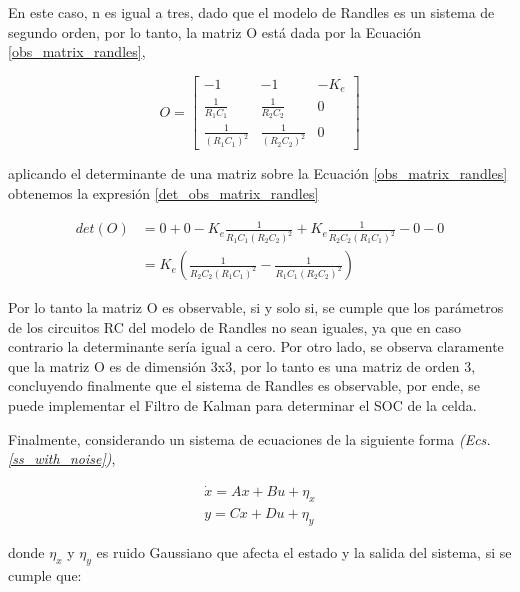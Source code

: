 \documentclass[10pt, a4paper]{report}
\begin{document}
En este caso, n es igual a tres, dado que el modelo de Randles es un sistema de 
segundo orden, por lo tanto, la matriz O est\'a dada por la Ecuaci\'on 
\ref{obs_matrix_randles},

\begin{equation}
    O = \begin{bmatrix}
        -1 & -1 & -K_e \\
        \frac{1}{R_1C_1} & \frac{1}{R_2C_2} & 0 \\
        \frac{1}{\left(R_1C_1\right)^2} & \frac{1}{\left(R_2C_2\right)^2} & 0
        \end{bmatrix}\label{obs_matrix_randles}
\end{equation}

aplicando el determinante de una matriz sobre la Ecuaci\'on
\ref{obs_matrix_randles} obtenemos la expresi\'on \ref{det_obs_matrix_randles}

\begin{align}
    det\left(O\right) &= 0 + 0 -K_e \frac{1}{R_1C_1\left(R_2C_2\right)^2} + 
                        K_e \frac{1}{R_2C_2\left(R_1C_1\right)^2} - 0 -
                        0\nonumber\\
                      &= K_e \left(\frac{1}{R_2C_2\left(R_1C_1\right)^2} - 
                                   \frac{1}{R_1C_1\left(R_2C_2\right)^2}\right)
                                   \label{det_obs_matrix_randles}
\end{align}

Por lo tanto la matriz O es observable, si y solo si, se cumple que los
par\'ametros de los circuitos RC del modelo de Randles no sean iguales, ya que
en caso contrario la determinante ser\'ia igual a cero. Por otro lado, se observa
claramente que la matriz O es de dimensi\'on 3x3, por lo tanto es una matriz de
orden 3, concluyendo finalmente que el sistema de Randles es observable, por 
ende, se puede implementar el Filtro de Kalman para determinar el \acrshort{SOC} 
de la celda.

Finalmente, considerando un sistema de ecuaciones de la siguiente forma \emph{(Ecs.
\ref{ss_with_noise})},

\begin{align}
    \dot{x} = Ax + Bu + \eta_x\nonumber\\
    y = Cx + Du + \eta_y\label{ss_with_noise}
\end{align}

donde $\eta_x$ y $\eta_y$ es ruido Gaussiano que afecta el estado y la salida
del sistema, si se cumple que:
\end{document}
